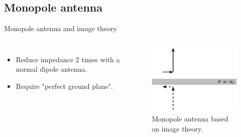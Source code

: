 \subsection{Monopole antenna}

\begin{frame}{Monopole antenna and image theory}
    \begin{columns}
        \begin{itemize}
            \item Reduce impedance 2 times with a normal dipole antenna.
            \item Require "perfect ground plane".
        \end{itemize}
        \begin{figure}
            \centering
            \includegraphics[width=\textwidth]{Figures/Monopole.pdf}
            \caption{Monopole antenna based on image theory.}
            \label{fig:Monopole}
        \end{figure}
    \end{columns}
    
\end{frame}